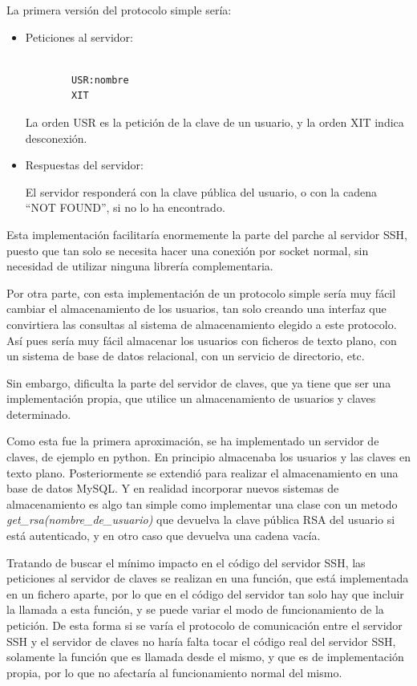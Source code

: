     La primera versión del protocolo simple sería:
    \begin{itemize}
    \item Peticiones al servidor:

        \begin{verbatim}

        USR:nombre
        XIT

        \end{verbatim}

        La orden USR es la petición de la clave de un usuario, y la orden
        XIT indica desconexión.

    \item Respuestas del servidor:

        El servidor responderá con la clave pública del usuario, o con la
        cadena ``NOT FOUND'', si no lo ha encontrado.

    \end{itemize}

    Esta implementación facilitaría enormemente la parte del parche al
    servidor SSH, puesto que tan solo se necesita hacer una conexión por
    socket normal, sin necesidad de utilizar ninguna librería
    complementaria.

    Por otra parte, con esta implementación de un protocolo simple sería
    muy fácil cambiar el almacenamiento de los usuarios, tan solo creando
    una interfaz que convirtiera las consultas al sistema de almacenamiento
    elegido a este protocolo. Así pues sería muy fácil almacenar los
    usuarios con ficheros de texto plano, con un sistema de base de datos
    relacional, con un servicio de directorio, etc.
    
    Sin embargo, dificulta la parte del servidor de claves, que ya tiene
    que ser una implementación propia, que utilice un almacenamiento de
    usuarios y claves determinado.

    Como esta fue la primera aproximación, se ha implementado un servidor
    de claves, de ejemplo en python. En principio almacenaba los usuarios y
    las claves en texto plano. Posteriormente se extendió para realizar el
    almacenamiento en una base de datos MySQL. Y en realidad incorporar
    nuevos sistemas de almacenamiento es algo tan simple como implementar
    una clase con un metodo \textit{get\_rsa(nombre\_de\_usuario)} que devuelva
    la clave pública RSA del usuario si está autenticado, y en otro caso
    que devuelva una cadena vacía.

    Tratando de buscar el mínimo impacto en el código del servidor SSH, las
    peticiones al servidor de claves se realizan en una función, que está
    implementada en un fichero aparte, por lo que en el código del servidor
    tan solo hay que incluir la llamada a esta función, y se puede variar
    el modo de funcionamiento de la petición. De esta forma si se varía el
    protocolo de comunicación entre el servidor SSH y el servidor de claves
    no haría falta tocar el código real del servidor SSH, solamente la
    función que es llamada desde el mismo, y que es de implementación
    propia, por lo que no afectaría al funcionamiento normal del mismo.

